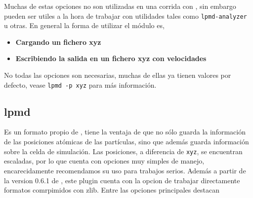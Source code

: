 Muchas de estas opciones no son utilizadas en una corrida con {\lpmd}, sin embargo pueden ser utiles a la hora de trabajar con utilidades tales como \verb|lpmd-analyzer| u otras. En general la forma de utilizar el m\'odulo es,

\begin{itemize}
 \item \textbf{Cargando un fichero xyz}
 \item \textbf{Escribiendo la salida en un fichero xyz con velocidades}
\end{itemize}

No todas las opciones son necesarias, muchas de ellas ya tienen valores por defecto, vease \verb|lpmd -p xyz| para m\'as informaci\'on.

\subsection{lpmd}

Es un formato propio de {\lpmd}, tiene la ventaja de que no s\'olo guarda la informaci\'on de las posiciones at\'omicas de las part\'iculas, sino que adem\'as guarda informaci\'on sobre la celda de simulaci\'on. Las posiciones, a diferencia de \verb|xyz|, se encuentran escaladas, por lo que cuenta con opciones muy simples de manejo, encarecidamente recomendamos su uso para trabajos serios. Adem\'as a partir de la version 0.6.1 de {\lpmd}, este plugin cuenta con la opcion de trabajar directamente formatos comrpimidos con zlib. Entre las opciones principales destacan


